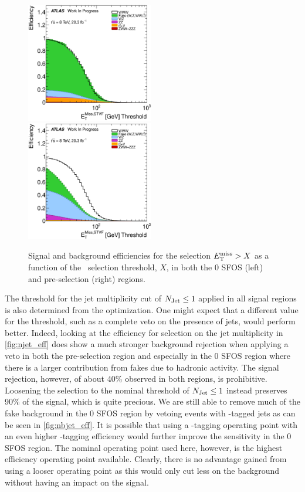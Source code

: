 \begin{figure}[ht!]
\centering
\includegraphics[width=0.495\textwidth]{figures/optimization/SignalRegionsPreselection_0SFOS_Efficiencies/MET_Et_STVF_Cumulative.eps}
\includegraphics[width=0.495\textwidth]{figures/optimization/SignalRegions_0p5mmZ0_Preselection_Efficiencies/MET_Et_STVF_Cumulative.eps}
\caption{ Signal and background efficiencies for the 
selection $E_{\mathrm{T}}^{\mathrm{miss}} > X$ as a function of the \MET~selection
threshold, $X$,  in both the 0 SFOS (left) and pre-selection (right) regions.  }
\label{fig:met_eff}
\end{figure}

The threshold for the jet multiplicity cut 
of $N_{\textrm{Jet}}\leq 1$ applied in all signal regions
is also determined from the optimization. One might expect
that a different value for the threshold, such as a complete
veto on the presence of jets, would perform better. 
Indeed, looking at the efficiency for selection on the jet multiplicity
in \fig\ref{fig:njet_eff} does show a much stronger background
rejection when applying a veto in both the pre-selection region
and especially in the 0 SFOS region where there is a larger
contribution from fakes due to hadronic activity.
The signal rejection, however,  of about 40\% observed in both
regions, is prohibitive. Loosening the selection to the nominal
threshold of $N_{\textrm{Jet}} \leq 1$ instead preserves 90\% of the signal, 
which is quite precious.  We are still able to remove 
much of the fake background in the 0 SFOS region by vetoing
events with \bee-tagged jets as can be seen in \fig\ref{fig:nbjet_eff}.
It is possible that using a \bee-tagging operating point
with an even higher \bee-tagging efficiency would further 
improve the sensitivity in the 0 SFOS region.  
The nominal operating point used here, however,  is the highest 
efficiency operating point available.
Clearly, there is no advantage gained from using a looser operating point
as this would only cut less on the background without having an impact
on the signal.



